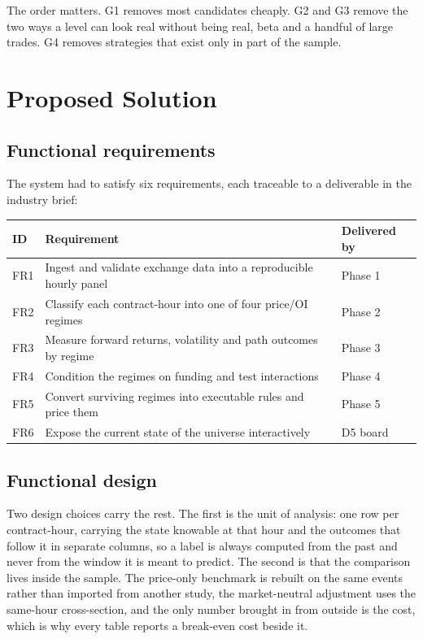 \documentclass[11pt,a4paper]{article}
\begin{document}
The order matters. G1 removes most candidates cheaply. G2 and G3 remove the two ways a level can look real without being real, beta and a handful of large trades. G4 removes strategies that exist only in part of the sample.

\bigskip

\section{Proposed Solution}

\subsection{Functional requirements}

The system had to satisfy six requirements, each traceable to a deliverable in the industry brief:

\begin{table}[H]\centering
\footnotesize
\begin{tabularx}{\linewidth}{>{\raggedright\arraybackslash}X>{\raggedright\arraybackslash}X>{\raggedright\arraybackslash}X}
\toprule
ID & Requirement & Delivered by \\
\midrule
FR1 & Ingest and validate exchange data into a reproducible hourly panel & Phase 1 \\
FR2 & Classify each contract-hour into one of four price/OI regimes & Phase 2 \\
FR3 & Measure forward returns, volatility and path outcomes by regime & Phase 3 \\
FR4 & Condition the regimes on funding and test interactions & Phase 4 \\
FR5 & Convert surviving regimes into executable rules and price them & Phase 5 \\
FR6 & Expose the current state of the universe interactively & D5 board \\
\bottomrule
\end{tabularx}
\end{table}

\subsection{Functional design}

Two design choices carry the rest. The first is the unit of analysis: one row per contract-hour, carrying the state knowable at that hour and the outcomes that follow it in separate columns, so a label is always computed from the past and never from the window it is meant to predict. The second is that the comparison lives inside the sample. The price-only benchmark is rebuilt on the same events rather than imported from another study, the market-neutral adjustment uses the same-hour cross-section, and the only number brought in from outside is the cost, which is why every table reports a break-even cost beside it.
\end{document}
